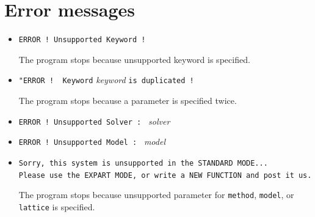 \section{Error messages}

\begin{itemize}
\item \verb|ERROR ! Unsupported Keyword !|

The program stops because unsupported keyword is specified.

\item \verb|"ERROR !  Keyword| \textit{keyword} \verb|is duplicated !|

The program stops because a parameter is specified twice.

\item \verb|ERROR ! Unsupported Solver : | \textit{solver} \vspace{-0.3cm}
\item \verb|ERROR ! Unsupported Model : | \textit{model} \vspace{-0.3cm}
\item \verb|Sorry, this system is unsupported in the STANDARD MODE...| \\
  \verb|Please use the EXPART MODE, or write a NEW FUNCTION and post it us.|

The program stops because unsupported parameter for 
\verb|method|, \verb|model|, or \verb|lattice|
is specified.


\end{itemize}

